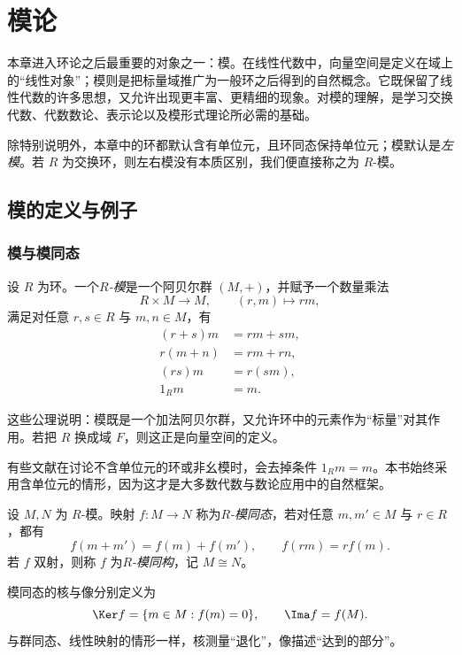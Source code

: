 \chapter{模论}

本章进入环论之后最重要的对象之一：模。在线性代数中，向量空间是定义在域上的“线性对象”；模则是把标量域推广为一般环之后得到的自然概念。它既保留了线性代数的许多思想，又允许出现更丰富、更精细的现象。对模的理解，是学习交换代数、代数数论、表示论以及模形式理论所必需的基础。

除特别说明外，本章中的环都默认含有单位元，且环同态保持单位元；模默认是\emph{左模}。若 $R$ 为交换环，则左右模没有本质区别，我们便直接称之为 $R$-模。

\section{模的定义与例子}

\subsection{模与模同态}

\begin{definition}
设 $R$ 为环。一个\emph{$R$-模}是一个阿贝尔群 $(M,+)$，并赋予一个数量乘法
\[
R\times M\longrightarrow M,\qquad (r,m)\longmapsto rm,
\]
满足对任意 $r,s\in R$ 与 $m,n\in M$，有
\begin{align*}
(r+s)m&=rm+sm,\\
r(m+n)&=rm+rn,\\
(rs)m&=r(sm),\\
1_Rm&=m.
\end{align*}
\end{definition}

这些公理说明：模既是一个加法阿贝尔群，又允许环中的元素作为“标量”对其作用。若把 $R$ 换成域 $F$，则这正是向量空间的定义。

\begin{remark}
有些文献在讨论不含单位元的环或非幺模时，会去掉条件 $1_Rm=m$。本书始终采用含单位元的情形，因为这才是大多数代数与数论应用中的自然框架。
\end{remark}

\begin{definition}
设 $M,N$ 为 $R$-模。映射 $f\colon M\to N$ 称为\emph{$R$-模同态}，若对任意 $m,m'\in M$ 与 $r\in R$，都有
\[
f(m+m')=f(m)+f(m'),\qquad f(rm)=rf(m).
\]
若 $f$ 双射，则称 $f$ 为\emph{$R$-模同构}，记 $M\cong N$。
\end{definition}

模同态的核与像分别定义为
\[
\Ker f=\{m\in M:f(m)=0\},\qquad \Ima f=f(M).
\]
与群同态、线性映射的情形一样，核测量“退化”，像描述“达到的部分”。

